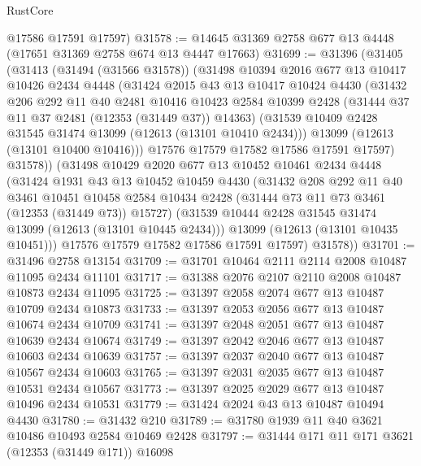 \begin{lexlean}{RustCore}
\begin{coremodule}
      @17586
      @17591
      @17597)
@31578 := @14645 @31369 @2758 @677 @13 @4448 (@17651 @31369 @2758 @674 @13 @4447 @17663)
@31699 := @31396
    (@31405
      (@31413
        (@31494 (@31566 @31578))
        (@31498
          @10394
          @2016
          @677
          @13
          @10417
          @10426
          @2434
          @4448
          (@31424
            @2015
            @43
            @13
            @10417
            @10424
            @4430
            (@31432
              @206
              @292
              @11
              @40
              @2481
              @10416
              @10423
              @2584
              @10399
              @2428
              (@31444 @37 @11 @37 @2481 (@12353 (@31449 @37)) @14363)
              (@31539 @10409 @2428 @31545 @31474 @13099 (@12613 (@13101 @10410 @2434)))
              @13099
              (@12613 (@13101 @10400 @10416)))
            @17576
            @17579
            @17582
            @17586
            @17591
            @17597)
          @31578))
      (@31498
        @10429
        @2020
        @677
        @13
        @10452
        @10461
        @2434
        @4448
        (@31424
          @1931
          @43
          @13
          @10452
          @10459
          @4430
          (@31432
            @208
            @292
            @11
            @40
            @3461
            @10451
            @10458
            @2584
            @10434
            @2428
            (@31444 @73 @11 @73 @3461 (@12353 (@31449 @73)) @15727)
            (@31539 @10444 @2428 @31545 @31474 @13099 (@12613 (@13101 @10445 @2434)))
            @13099
            (@12613 (@13101 @10435 @10451)))
          @17576
          @17579
          @17582
          @17586
          @17591
          @17597)
        @31578))
@31701 := @31496 @2758 @13154
@31709 := @31701 @10464 @2111 @2114 @2008 @10487 @11095 @2434 @11101
@31717 := @31388 @2076 @2107 @2110 @2008 @10487 @10873 @2434 @11095
@31725 := @31397 @2058 @2074 @677 @13 @10487 @10709 @2434 @10873
@31733 := @31397 @2053 @2056 @677 @13 @10487 @10674 @2434 @10709
@31741 := @31397 @2048 @2051 @677 @13 @10487 @10639 @2434 @10674
@31749 := @31397 @2042 @2046 @677 @13 @10487 @10603 @2434 @10639
@31757 := @31397 @2037 @2040 @677 @13 @10487 @10567 @2434 @10603
@31765 := @31397 @2031 @2035 @677 @13 @10487 @10531 @2434 @10567
@31773 := @31397 @2025 @2029 @677 @13 @10487 @10496 @2434 @10531
@31779 := @31424 @2024 @43 @13 @10487 @10494 @4430
@31780 := @31432 @210
@31789 := @31780 @1939 @11 @40 @3621 @10486 @10493 @2584 @10469 @2428
@31797 := @31444 @171 @11 @171 @3621 (@12353 (@31449 @171)) @16098

\end{coremodule}
\end{lexlean}
